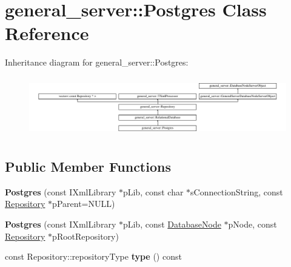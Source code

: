 \hypertarget{classgeneral__server_1_1Postgres}{\section{general\-\_\-server\-:\-:\-Postgres \-Class \-Reference}
\label{classgeneral__server_1_1Postgres}
}
\-Inheritance diagram for general\-\_\-server\-:\-:\-Postgres\-:\begin{figure}[H]
\begin{center}
\leavevmode
\includegraphics[height=2.621723cm]{classgeneral__server_1_1Postgres}
\end{center}
\end{figure}
\subsection*{\-Public \-Member \-Functions}
\begin{DoxyCompactItemize}
\item 
\hypertarget{classgeneral__server_1_1Postgres_a53c49f37e0c95860a6a60b6e31451986}{{\bfseries \-Postgres} (const \-I\-Xml\-Library $\ast$p\-Lib, const char $\ast$s\-Connection\-String, const \hyperlink{classgeneral__server_1_1Repository}{\-Repository} $\ast$p\-Parent=\-N\-U\-L\-L)}\label{classgeneral__server_1_1Postgres_a53c49f37e0c95860a6a60b6e31451986}

\item 
\hypertarget{classgeneral__server_1_1Postgres_a8ccb0674e1ad5c63dceb117adb1885a0}{{\bfseries \-Postgres} (const \-I\-Xml\-Library $\ast$p\-Lib, const \hyperlink{classgeneral__server_1_1DatabaseNode}{\-Database\-Node} $\ast$p\-Node, const \hyperlink{classgeneral__server_1_1Repository}{\-Repository} $\ast$p\-Root\-Repository)}\label{classgeneral__server_1_1Postgres_a8ccb0674e1ad5c63dceb117adb1885a0}

\item 
\hypertarget{classgeneral__server_1_1Postgres_aedbafbd25aa1fdc546dbc3e8c0cd7f30}{const \-Repository\-::repository\-Type {\bfseries type} () const }\label{classgeneral__server_1_1Postgres_aedbafbd25aa1fdc546dbc3e8c0cd7f30}

\end{DoxyCompactItemize}
